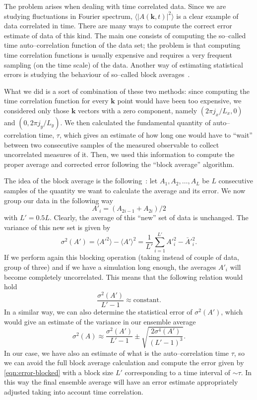 The problem arises when dealing with time correlated data. Since we are studying fluctuations in Fourier spectrum, $\langle |A(\bm{k},t)|^2 \rangle$ is a clear example of data correlated in time. There are many ways to compute the correct error estimate of data of this kind. The main one consists of computing the so--called time auto--correlation function of the data set; the problem is that computing time correlation functions is usually expensive and requires a very frequent sampling (on the time scale) of the data. Another way of estimating statistical errors is studying the behaviour of so--called block averages~\cite{FrenkelSmitMD}.

What we did is a sort of combination of these two methods: since computing the time correlation function for every $\bm{k}$ point would have been too expensive, we considered only those $\bm{k}$ vectors with a zero component, namely $(2\pi j_x/L_x,0)$ and $(0,2\pi j_y/L_y)$. We then calculated the fundamental quantity of auto--correlation time, $\tau$, which gives an estimate of how long one would have to ``wait'' between two consecutive samples of the measured observable to collect uncorrelated measures of it. Then, we used this information to compute the proper average and corrected error following the ``block average'' algorithm.

The idea of the block average is the following~\cite{Flyvbjerg1989}: let $A_1,A_2,\dots,A_L$ be $L$ consecutive samples of the quantity we want to calculate the average and its error. We now group our data in the following way
\begin{equation}
    A'_i= (A_{2i-1}+A_{2i})/2
\end{equation}
with $L'=0.5 L$. Clearly, the average of this ``new'' set of data is unchanged. The variance of this new set is given by
\begin{equation}
    \sigma^2(A')=\langle A'^2 \rangle - \langle A'\rangle^2=\frac{1}{L'}\sum_{i=1}^{L'} A'^2_i-\bar{A}'^2_i.
\end{equation}
If we perform again this blocking operation (taking instead of couple of data, group of three) and if we have a simulation long enough, the averages $A'_i$ will become completely uncorrelated. This means that the following relation would hold
\begin{equation}
    \frac{\sigma^2(A')}{L'-1}\approx \text{constant}.
\end{equation}
In a similar way, we can also determine the statistical error of $\sigma^2(A')$, which would give an estimate of the variance in our ensemble average
\begin{equation}
\label{eqn:error-blocked}
    \sigma^2(A) \approx \frac{\sigma^2(A')}{L'-1} \pm \sqrt{\frac{2\sigma^4(A')}{(L'-1)^3}}.
\end{equation}
In our case, we have also an estimate of what is the auto--correlation time $\tau$, so we can avoid the full block average calculation and compute the error given by \cref{eqn:error-blocked} with a block size $L'$ corresponding to a time interval of $\sim \tau$. In this way the final ensemble average will have an error estimate appropriately adjusted taking into account time correlation.

